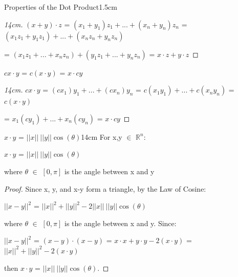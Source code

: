 \begin{ltheorem}{Properties of the Dot Product}{1.5cm}
            \begin{proof}[14cm]
                $(x+y) \cdot z$
                = $(x_1+y_1)z_1 + ... + (x_n+y_n)z_n$
                = $(x_1z_1+y_1z_1) + ... + (x_nz_n+y_nz_n)$

                \hspace{1.6cm}
                = $(x_1z_1 + ... + x_nz_n) + (y_1z_1 + ... + y_nz_n)$
                = $x \cdot z + y \cdot z$
            \end{proof}

        \item $cx \cdot y$ = $c(x \cdot y)$ = $x \cdot cy$
        
            \begin{proof}[14cm]
                $cx \cdot y$
                = $(cx_1)y_1 + ... + (cx_n)y_n$
                = $c(x_1y_1) + ... + c(x_ny_n)$
                = $c (x \cdot y)$
                
                \hspace{0.9cm}
                = $x_1(cy_1) + ... + x_n(cy_n)$
                = $x \cdot cy$
            \end{proof}
    \end{ltheorem}

    \vspace{0.5cm}

    \begin{wtheorem}{$x \cdot y$ = $||x|| \ ||y|| \cos(\theta)$}{14cm}
        For x,y $\in$ $\mathbb{R}^n$:

        \hspace{0.5cm}
        $x \cdot y$ = $||x|| \ ||y|| \cos(\theta)$

        where $\theta$ $\in$ $[0,\pi]$ is the angle between x and y
    \end{wtheorem}

    \begin{proof}
        Since x, y, and x-y form a triangle, by the Law of Cosine:

        \hspace{0.5cm}
        $||x-y||^2$ = $||x||^2 + ||y||^2 - 2||x|| \ ||y|| \cos(\theta)$
        
        where $\theta$ $\in$ $[0,\pi]$ is the angle between x and y. Since:

        \hspace{0.5cm}
        $||x-y||^2$
        = $(x - y) \cdot (x - y)$
        = $x \cdot x + y \cdot y - 2(x \cdot y)$
        = $||x||^2 + ||y||^2 - 2(x \cdot y)$

        then $x \cdot y$ = $||x|| \ ||y|| \cos(\theta)$.
    \end{proof}

